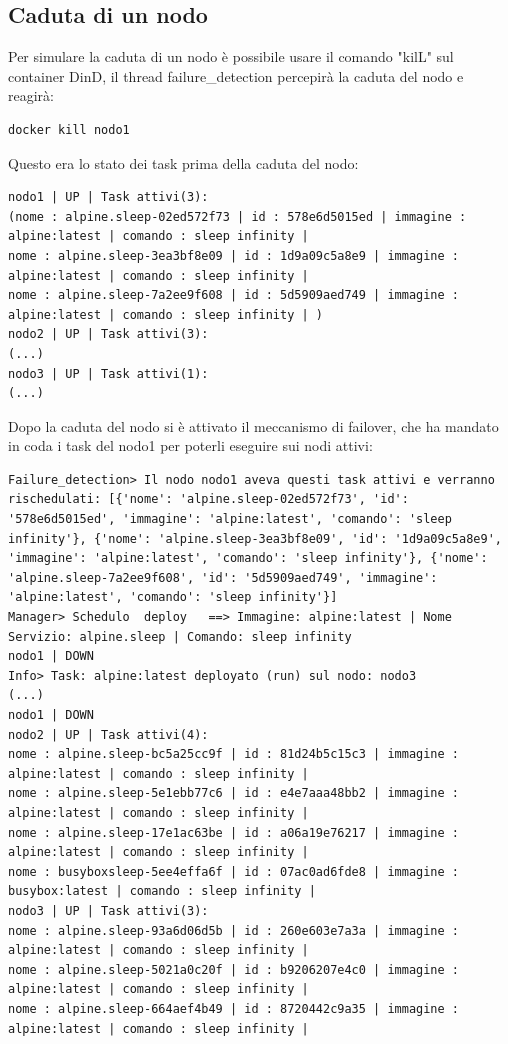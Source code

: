 \documentclass[12pt,a4paper]{article}
\begin{document}
\subsection{Caduta di un nodo}
Per simulare la caduta di un nodo è possibile usare il comando "kilL" sul container DinD, il thread failure\_detection percepirà la caduta del nodo e reagirà:
\begin{verbatim}
docker kill nodo1
\end{verbatim}
Questo era lo stato dei task prima della caduta del nodo:
\begin{verbatim}
nodo1 | UP | Task attivi(3): 
(nome : alpine.sleep-02ed572f73 | id : 578e6d5015ed | immagine : alpine:latest | comando : sleep infinity | 
nome : alpine.sleep-3ea3bf8e09 | id : 1d9a09c5a8e9 | immagine : alpine:latest | comando : sleep infinity | 
nome : alpine.sleep-7a2ee9f608 | id : 5d5909aed749 | immagine : alpine:latest | comando : sleep infinity | )
nodo2 | UP | Task attivi(3): 
(...)
nodo3 | UP | Task attivi(1): 
(...)
\end{verbatim}
Dopo la caduta del nodo si è attivato il meccanismo di failover, che ha mandato in coda i task del nodo1 per poterli eseguire sui nodi attivi:
\begin{verbatim}
Failure_detection> Il nodo nodo1 aveva questi task attivi e verranno rischedulati: [{'nome': 'alpine.sleep-02ed572f73', 'id': '578e6d5015ed', 'immagine': 'alpine:latest', 'comando': 'sleep infinity'}, {'nome': 'alpine.sleep-3ea3bf8e09', 'id': '1d9a09c5a8e9', 'immagine': 'alpine:latest', 'comando': 'sleep infinity'}, {'nome': 'alpine.sleep-7a2ee9f608', 'id': '5d5909aed749', 'immagine': 'alpine:latest', 'comando': 'sleep infinity'}]
Manager> Schedulo  deploy   ==> Immagine: alpine:latest | Nome Servizio: alpine.sleep | Comando: sleep infinity
nodo1 | DOWN
Info> Task: alpine:latest deployato (run) sul nodo: nodo3
(...)
nodo1 | DOWN
nodo2 | UP | Task attivi(4): 
nome : alpine.sleep-bc5a25cc9f | id : 81d24b5c15c3 | immagine : alpine:latest | comando : sleep infinity | 
nome : alpine.sleep-5e1ebb77c6 | id : e4e7aaa48bb2 | immagine : alpine:latest | comando : sleep infinity | 
nome : alpine.sleep-17e1ac63be | id : a06a19e76217 | immagine : alpine:latest | comando : sleep infinity | 
nome : busyboxsleep-5ee4effa6f | id : 07ac0ad6fde8 | immagine : busybox:latest | comando : sleep infinity | 
nodo3 | UP | Task attivi(3): 
nome : alpine.sleep-93a6d06d5b | id : 260e603e7a3a | immagine : alpine:latest | comando : sleep infinity | 
nome : alpine.sleep-5021a0c20f | id : b9206207e4c0 | immagine : alpine:latest | comando : sleep infinity | 
nome : alpine.sleep-664aef4b49 | id : 8720442c9a35 | immagine : alpine:latest | comando : sleep infinity | 

\end{verbatim}
\newpage
\end{document}
